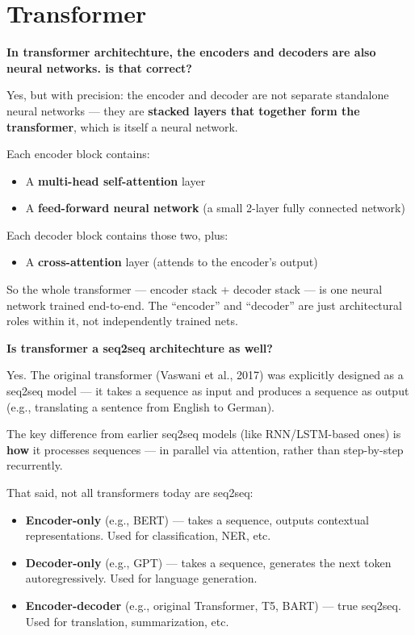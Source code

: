 \section{Transformer}

\textbf{In transformer architechture, the encoders and decoders are also neural networks. is that correct?}

Yes, but with precision: the encoder and decoder are not separate standalone neural networks --- they are \textbf{stacked layers that together form the transformer}, which is itself a neural network.

Each encoder block contains:
\begin{itemize}
  \item A \textbf{multi-head self-attention} layer
  \item A \textbf{feed-forward neural network} (a small 2-layer fully connected network)
\end{itemize}

Each decoder block contains those two, plus:
\begin{itemize}
  \item A \textbf{cross-attention} layer (attends to the encoder's output)
\end{itemize}

So the whole transformer --- encoder stack + decoder stack --- is one neural network trained end-to-end. The ``encoder'' and ``decoder'' are just architectural roles within it, not independently trained nets.

\medskip

\textbf{Is transformer a seq2seq architechture as well?}

Yes. The original transformer (Vaswani et al., 2017) was explicitly designed as a seq2seq model --- it takes a sequence as input and produces a sequence as output (e.g., translating a sentence from English to German).

The key difference from earlier seq2seq models (like RNN/LSTM-based ones) is \textbf{how} it processes sequences --- in parallel via attention, rather than step-by-step recurrently.

That said, not all transformers today are seq2seq:

\begin{itemize}
  \item \textbf{Encoder-only} (e.g., BERT) --- takes a sequence, outputs contextual representations. Used for classification, NER, etc.
  \item \textbf{Decoder-only} (e.g., GPT) --- takes a sequence, generates the next token autoregressively. Used for language generation.
  \item \textbf{Encoder-decoder} (e.g., original Transformer, T5, BART) --- true seq2seq. Used for translation, summarization, etc.
\end{itemize}


